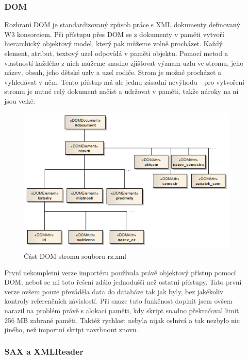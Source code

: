 \documentclass[11pt,twoside,a4paper]{book}
\begin{document}
\subsubsection{DOM}
Rozhraní DOM je standardizovaný způsob práce s XML dokumenty definovaný W3 konsorciem. Při přístupu přes DOM se z dokumenty v paměti vytvoří hierarchický objektový model, který pak můžeme volně procházet. Každý element, atribut, textový uzel odpovídá v paměti objektu. Pomocí metod a vlastností každého z nich můžeme snadno zjišťovat význam uzlu ve stromu, jeho název, obsah, jeho dětské uzly a uzel rodiče. Strom je možné procházet a vyhledávat v něm. Tento přístup má ale jednu zásadní nevýhodu - pro vytvoření stromu je nutné celý dokument načíst a udržovat v paměti, takže nároky na ni jsou velké.
\begin{figure}[h]
\begin{center}
\includegraphics[width=12cm]{figures/dom.png}
\caption{Část DOM stromu souboru rz.xml}
\label{fig:dom}
\end{center}
\end{figure}

První nekompletní verze importéru používala právě objektový přístup pomocí DOM, neboť se mi toto řešení zdálo jednodušší než ostatní přístupy. Tato první verze ovšem pouze převáděla data do databáze tak jak byly, bez jakékoliv kontroly referenčních závislostí. Při snaze tuto funkčnost doplnit jsem ovšem narazil na problém právě s alokací paměti, kdy skript snadno překračoval limit 256 MB zabrané paměti. Taktéž rychlost nebyla nijak oslnivá a tak nezbylo nic jiného, než importní skript navrhnout znovu.

\subsubsection{SAX a XMLReader}
\end{document}
